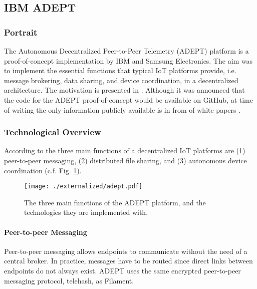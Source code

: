 

\subsection{IBM ADEPT}

\subsubsection{Portrait}
The Autonomous Decentralized Peer-to-Peer Telemetry (ADEPT) platform is a proof-of-concept implementation by IBM and Samsung Electronics. The aim was to implement the essential functions that typical IoT platforms provide, i.e. message brokering, data sharing, and device coordination, in a decentralized architecture. The motivation is presented in \cite{devicedemocracy}. 
Although it was announced that the code for the ADEPT proof-of-concept would be available on GitHub, at time of writing the only information publicly available is in from of white papers \cite{empoweringtheedge}. 

\subsubsection{Technological Overview}

According to \cite{empoweringtheedge} the three main functions of a decentralized IoT platforms are (1) peer-to-peer messaging, (2) distributed file sharing, and (3) autonomous device coordination (c.f. Fig. \ref{fig:adept}). 

\begin{figure}
\centering
\texttt{[image: ./externalized/adept.pdf]}
\caption{The three main functions of the ADEPT platform, and the technologies they are implemented with.}
\label{fig:adept}
\end{figure}

\paragraph{Peer-to-peer Messaging}

Peer-to-peer messaging allows endpoints to communicate without the need of a central broker. In practice, messages have to be routed since direct links between endpoints do not always exist. ADEPT uses the same encrypted peer-to-peer messaging protocol, telehash, as Filament. 

